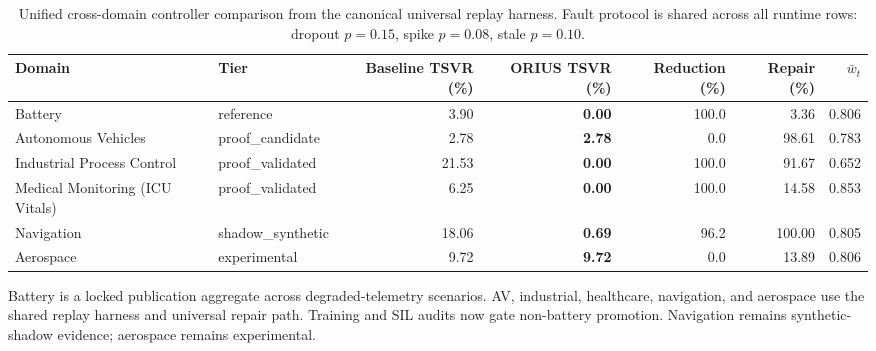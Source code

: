 \begin{table}[htbp]
\centering
\caption{Unified cross-domain controller comparison from the canonical
universal replay harness. Fault protocol is shared across all runtime
rows: dropout $p{=}0.15$, spike $p{=}0.08$, stale $p{=}0.10$.}
\label{tab:all_domain_comparison}
\begin{tabular}{llrrrrr}
\toprule
Domain & Tier & Baseline TSVR (\%) & ORIUS TSVR (\%) & Reduction (\%) & Repair (\%) & $\bar{w}_t$ \\
\midrule
Battery & reference & 3.90 & \textbf{0.00} & 100.0 & 3.36 & 0.806 \\
Autonomous Vehicles & proof\_candidate & 2.78 & \textbf{2.78} & 0.0 & 98.61 & 0.783 \\
Industrial Process Control & proof\_validated & 21.53 & \textbf{0.00} & 100.0 & 91.67 & 0.652 \\
Medical Monitoring (ICU Vitals) & proof\_validated & 6.25 & \textbf{0.00} & 100.0 & 14.58 & 0.853 \\
Navigation & shadow\_synthetic & 18.06 & \textbf{0.69} & 96.2 & 100.00 & 0.805 \\
Aerospace & experimental & 9.72 & \textbf{9.72} & 0.0 & 13.89 & 0.806 \\
\bottomrule
\end{tabular}
\smallskip
\begin{minipage}{0.95\linewidth}\footnotesize
Battery is a locked publication aggregate across degraded-telemetry
scenarios. AV, industrial, healthcare, navigation, and aerospace use
the shared replay harness and universal repair path. Training and SIL
audits now gate non-battery promotion. Navigation remains synthetic-shadow
evidence; aerospace remains experimental.
\end{minipage}
\end{table}
